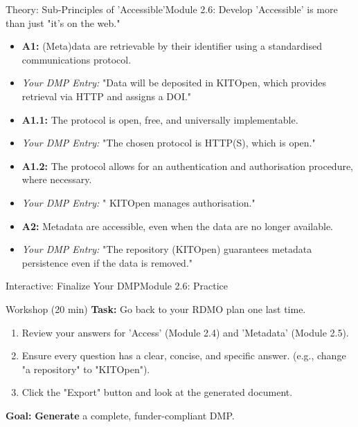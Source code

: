 \begin{frame}{Theory: Sub-Principles of 'Accessible'}{Module 2.6: Develop}
    'Accessible' is more than just "it's on the web."
    
    \begin{itemize}
        \item \textbf{A1:} (Meta)data are retrievable by their identifier using a standardised communications protocol.
        \item \textit{Your DMP Entry:} "Data will be deposited in KITOpen, which provides retrieval via HTTP and assigns a DOI."
        \pause
        \item \textbf{A1.1:} The protocol is open, free, and universally implementable.
        \item \textit{Your DMP Entry:} "The chosen protocol is HTTP(S), which is open."
        \pause
        \item \textbf{A1.2:} The protocol allows for an authentication and authorisation procedure, where necessary.
        \item \textit{Your DMP Entry:} "%
        KITOpen manages authorisation."
        \pause
        \item \textbf{A2:} Metadata are accessible, even when the data are no longer available.
        \item \textit{Your DMP Entry:} "The repository (KITOpen) guarantees metadata persistence even if the data is removed."
    \end{itemize}
\end{frame}

\begin{frame}{Interactive: Finalize Your DMP}{Module 2.6: Practice}
    \begin{block}{Workshop (20 min)}
        \textbf{Task:} Go back to your RDMO plan one last time.
        \pause
        \begin{enumerate}
            \item Review your answers for 'Access' (Module 2.4) and 'Metadata' (Module 2.5).
            \pause
            \item Ensure every question has a clear, concise, and specific answer. (e.g., change "a repository" to "KITOpen").
            \pause
            \item Click the "Export" button and look at the generated document.
        \end{enumerate}
        \pause
        \textbf{Goal:} \textbf{Generate} a complete, funder-compliant DMP.
    \end{block}
\end{frame}

